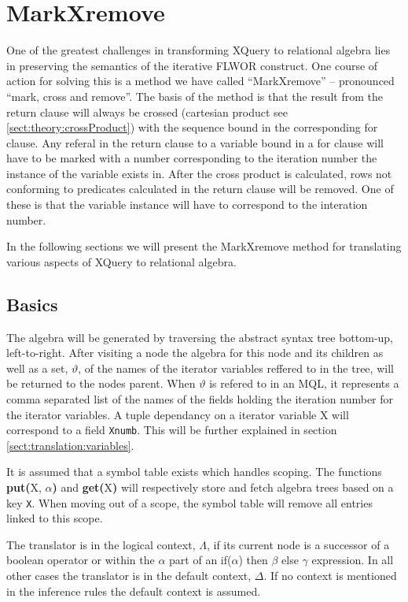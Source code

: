 \section{MarkXremove}
\label{sect:translation:markXremove}

One of the greatest challenges in transforming XQuery to relational algebra
lies in preserving the semantics of the iterative FLWOR construct. One
course of action for solving this is a method we have called ``MarkXremove'' --
pronounced ``mark, cross and remove''. The basis of the method is that the
result from the \textsf{return} clause will always be crossed (cartesian product
see \ref{sect:theory:crossProduct}) with the sequence bound in the
corresponding \textsf{for} clause. Any referal in the \textsf{return} clause to a
variable bound in a \textsf{for} clause will have to be marked with a number
corresponding to the iteration number the instance of the variable exists in.
After the cross product is calculated, rows not conforming to predicates
calculated in the \textsf{return} clause will be removed. One of these is that
the variable instance will have to correspond to the interation number.

In the following sections we will present the MarkXremove method for
translating various aspects of XQuery to relational algebra.

\subsection{Basics}
The algebra will be generated by traversing the abstract syntax tree bottom-up, left-to-right. After visiting a
node the algebra for this node and its children as well as a set, $\vartheta$, of the names of the iterator
variables reffered to in the tree, will be returned to the nodes parent. When $\vartheta$ is refered to in an MQL,
it represents a comma separated list of the names of the fields holding the iteration number for the iterator
variables. A tuple dependancy on a iterator variable \textsf{X} will correspond to a field \texttt{Xnumb}. This
will be further explained in section \ref{sect:translation:variables}.

It is assumed that a symbol table exists which handles scoping. The functions
\textbf{put(}\textsf{X}, $\alpha$\textbf{)} and \textbf{get(}\textsf{X}\textbf{)}
will respectively store and fetch algebra trees based on a key \verb!X!. When
moving out of a scope, the symbol table will remove all entries linked to this scope.

The translator is in the logical context, $\Lambda$, if its current node is a
successor of a boolean operator or within the $\alpha$ part of an
\textsf{if($\alpha$) then $\beta$ else $\gamma$} expression. In all other cases
the translator is in the default context, $\Delta$. If no context is mentioned
in the inference rules the default context is assumed.

